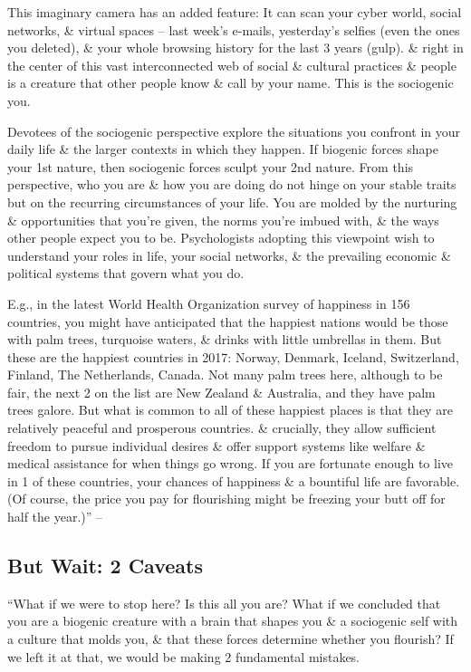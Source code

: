 \documentclass{article}
\numberwithin{equation}{section}
\begin{document}
This imaginary camera has an added feature: It can scan your cyber world, social networks, \& virtual spaces -- last week's e-mails, yesterday's selfies (even the ones you deleted), \& your whole browsing history for the last 3 years (gulp). \& right in the center of this vast interconnected web of social \& cultural practices \& people is a creature that other people know \& call by your name. This is the sociogenic you.

Devotees of the sociogenic perspective explore the situations you confront in your daily life \& the larger contexts in which they happen. If biogenic forces shape your 1st nature, then sociogenic forces sculpt your 2nd nature. From this perspective, who you are \& how you are doing do not hinge on your stable traits but on the recurring circumstances of your life. You are molded by the nurturing \& opportunities that you're given, the norms you're imbued with, \& the ways other people expect you to be. Psychologists adopting this viewpoint wish to understand your roles in life, your social networks, \& the prevailing economic \& political systems that govern what you do.

E.g., in the latest World Health Organization survey of happiness in 156 countries, you might have anticipated that the happiest nations would be those with palm trees, turquoise waters, \& drinks with little umbrellas in them. But these are the happiest countries in 2017: Norway, Denmark, Iceland, Switzerland, Finland, The Netherlands, Canada. Not many palm trees here, although to be fair, the next 2 on the list are New Zealand \& Australia, and they have palm trees galore. But what is common to all of these happiest places is that they are relatively peaceful and prosperous countries. \& crucially, they allow sufficient freedom to pursue individual desires \& offer support systems like welfare \& medical assistance for when things go wrong. If you are fortunate enough to live in 1 of these countries, your chances of happiness \& a bountiful life are favorable. (Of course, the price you pay for flourishing might be freezing your butt off for half the year.)'' -- \cite[pp. 20--21]{Little2017}

\subsection{But Wait: 2 Caveats}
``What if we were to stop here? Is this all you are? What if we concluded that you are a biogenic creature with a brain that shapes you \& a sociogenic self with a culture that molds you, \& that these forces determine whether you flourish? If we left it at that, we would be making 2 fundamental mistakes.
\end{document}
